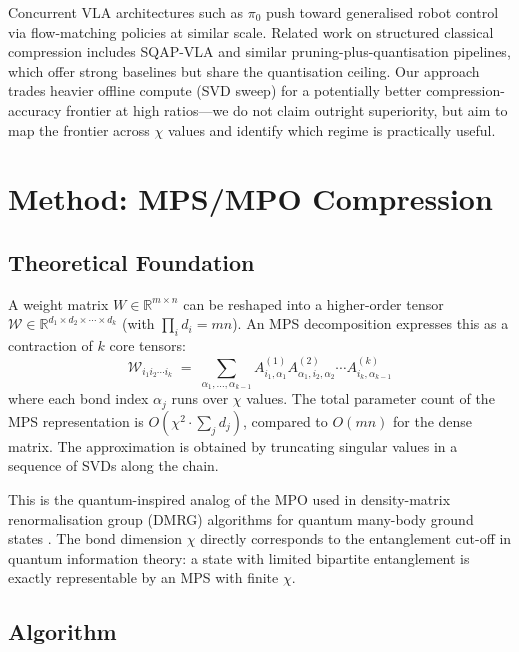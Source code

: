 \documentclass[10pt,twocolumn]{article}
\begin{document}
Concurrent VLA architectures such as $\pi_0$ \cite{black2024pi0} push toward
generalised robot control via flow-matching policies at similar scale.
Related work on structured classical compression includes SQAP-VLA and similar
pruning-plus-quantisation pipelines, which offer strong baselines but share the
quantisation ceiling. Our approach trades heavier offline compute (SVD sweep) for a
potentially better compression-accuracy frontier at high ratios---we do not claim
outright superiority, but aim to map the frontier across $\chi$ values and identify
which regime is practically useful.

\section{Method: MPS/MPO Compression}

\subsection{Theoretical Foundation}

A weight matrix $W \in \mathbb{R}^{m \times n}$ can be reshaped into a
higher-order tensor $\mathcal{W} \in \mathbb{R}^{d_1 \times d_2 \times \cdots \times d_k}$
(with $\prod_i d_i = mn$). An MPS decomposition expresses this as a contraction of
$k$ core tensors:
\[
  \mathcal{W}_{i_1 i_2 \cdots i_k}
  \;=\;
  \sum_{\alpha_1,\ldots,\alpha_{k-1}}
    A^{(1)}_{i_1,\alpha_1}
    A^{(2)}_{\alpha_1,i_2,\alpha_2}
    \cdots
    A^{(k)}_{i_k,\alpha_{k-1}}
\]
where each bond index $\alpha_j$ runs over $\chi$ values. The total parameter
count of the MPS representation is $O(\chi^2 \cdot \sum_j d_j)$, compared to
$O(mn)$ for the dense matrix. The approximation is obtained by truncating singular
values in a sequence of SVDs along the chain.

This is the quantum-inspired analog of the MPO used in density-matrix renormalisation
group (DMRG) algorithms for quantum many-body ground states \cite{liu2024provable}.
The bond dimension $\chi$ directly corresponds to the entanglement cut-off in
quantum information theory: a state with limited bipartite entanglement is exactly
representable by an MPS with finite $\chi$.

\subsection{Algorithm}
\end{document}
